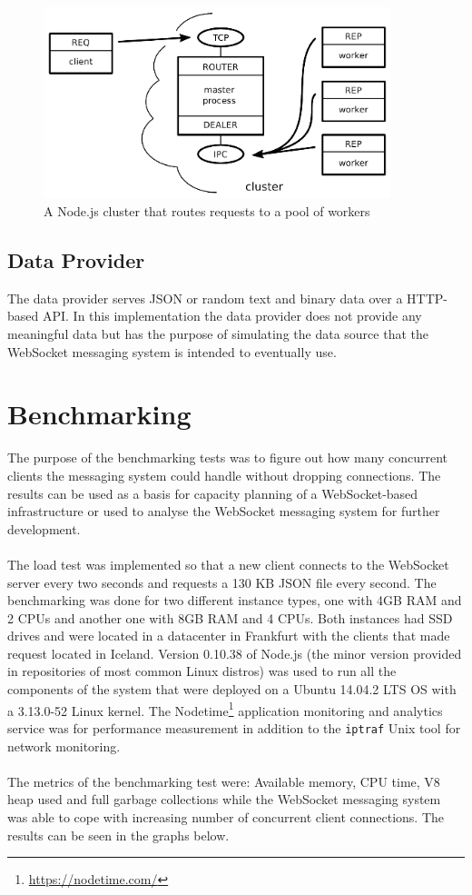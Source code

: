 \begin{figure}[h!]
	\centering
	\label{fig:webSocketMessagingSystem}\includegraphics[width=0.9\textwidth]{images/poolOfWorkers}
	\caption{A Node.js cluster that routes requests to a pool of workers \cite{judd2008node}}
\end{figure}

\subsection{Data Provider}

The data provider serves JSON or random text and binary data over a HTTP-based API. In this implementation the data provider does not provide any meaningful data but has the purpose of simulating the data source that the WebSocket messaging system is intended to eventually use.

\section{Benchmarking}

The purpose of the benchmarking tests was to figure out how many concurrent clients the messaging system could handle without dropping connections. The results can be used as a basis for capacity planning of a WebSocket-based infrastructure or used to analyse the WebSocket messaging system for further development.
\\ \\
The load test was implemented so that a new client connects to the WebSocket server every two seconds and requests a 130 KB JSON file every second. The benchmarking was done for two different instance types, one with 4GB RAM  and 2 CPUs and another one with 8GB RAM and 4 CPUs. Both instances had SSD drives and were located in a datacenter in Frankfurt with the clients that made request located in Iceland. Version 0.10.38 of Node.js (the minor version provided in repositories of most common Linux distros) was used to run all the components of the system that were deployed on a Ubuntu 14.04.2 LTS OS with a 3.13.0-52 Linux kernel. The Nodetime\footnote{\url{https://nodetime.com/}} application monitoring and analytics service was for performance measurement in addition to the \texttt{iptraf} Unix tool for network monitoring.
\\ \\
The metrics of the benchmarking test were: Available memory, CPU time, V8 heap used and full garbage collections while the WebSocket messaging system was able to cope with increasing number of concurrent client connections. The results can be seen in the graphs below.

